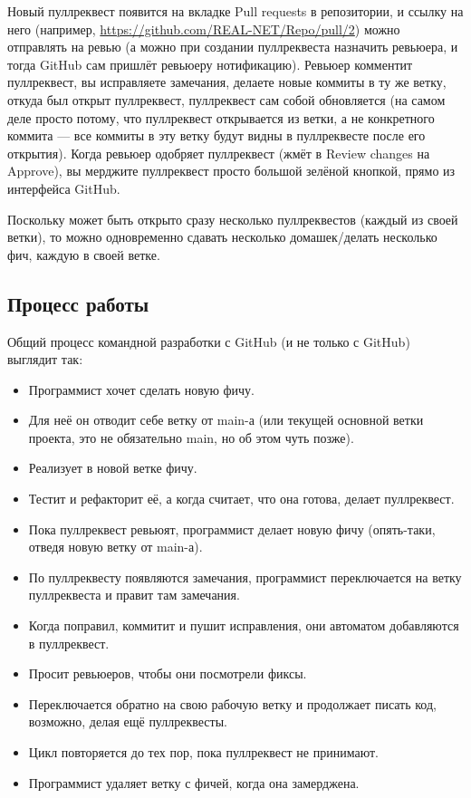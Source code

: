\documentclass{../text-style}
\begin{document}
Новый пуллреквест появится на вкладке Pull requests в репозитории, и ссылку на него (например, \url{https://github.com/REAL-NET/Repo/pull/2}) можно отправлять на ревью (а можно при создании пуллреквеста назначить ревьюера, и тогда GitHub сам пришлёт ревьюеру нотификацию). Ревьюер комментит пуллреквест, вы исправляете замечания, делаете новые коммиты в ту же ветку, откуда был открыт пуллреквест, пуллреквест сам собой обновляется (на самом деле просто потому, что пуллреквест открывается из ветки, а не конкретного коммита --- все коммиты в эту ветку будут видны в пуллреквесте после его открытия). Когда ревьюер одобряет пуллреквест (жмёт в Review changes на Approve), вы мерджите пуллреквест просто большой зелёной кнопкой, прямо из интерфейса GitHub.

Поскольку может быть открыто сразу несколько пуллреквестов (каждый из своей ветки), то можно одновременно сдавать несколько домашек/делать несколько фич, каждую в своей ветке.

\subsection{Процесс работы}

Общий процесс командной разработки с GitHub (и не только с GitHub) выглядит так:

\begin{itemize}
    \item Программист хочет сделать новую фичу.
    \item Для неё он отводит себе ветку от main-а (или текущей основной ветки проекта, это не обязательно main, но об этом чуть позже).
    \item Реализует в новой ветке фичу.
    \item Тестит и рефакторит её, а когда считает, что она готова, делает пуллреквест.
    \item Пока пуллреквест ревьюят, программист делает новую фичу (опять-таки, отведя новую ветку от main-а).
    \item По пуллреквесту появляются замечания, программист переключается на ветку пуллреквеста и правит там замечания.
    \item Когда поправил, коммитит и пушит исправления, они автоматом добавляются в пуллреквест.
    \item Просит ревьюеров, чтобы они посмотрели фиксы.
    \item Переключается обратно на свою рабочую ветку и продолжает писать код, возможно, делая ещё пуллреквесты.
    \item Цикл повторяется до тех пор, пока пуллреквест не принимают.
    \item Программист удаляет ветку с фичей, когда она замерджена.
\end{itemize}
\end{document}
